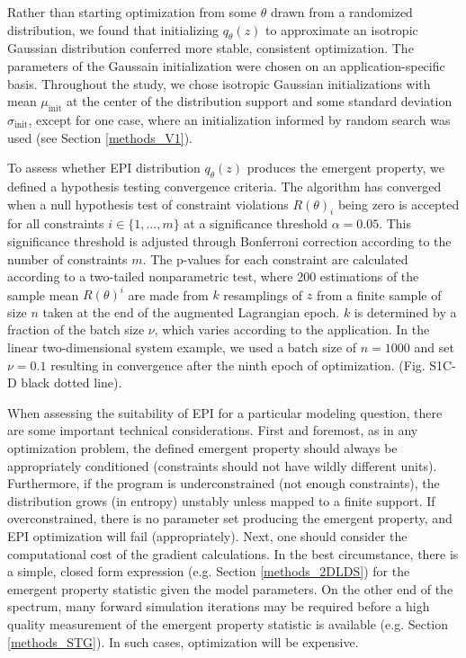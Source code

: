 \documentclass[11pt]{article}
\begin{document}
Rather than starting optimization from some $\theta$ drawn from a randomized distribution, we found that initializing $q_\theta(z)$ to approximate an isotropic Gaussian distribution conferred more stable, consistent optimization.  The parameters of the Gaussain initialization were chosen on an application-specific basis.  
Throughout the study, we chose isotropic Gaussian initializations with mean $\mu_{\text{init}}$ at the center of the distribution support and some standard deviation $\sigma_{\text{init}}$, except for one case, where an initialization informed by random search was used (see Section \ref{methods_V1}).

To assess whether EPI distribution $q_\theta(z)$ produces the emergent property, we defined a hypothesis testing convergence criteria.  
The algorithm has converged when a null hypothesis test of constraint violations $R(\theta)_i$ being zero is accepted for all constraints $i \in \{1, ..., m\}$ at a significance threshold $\alpha=0.05$.  
This significance threshold is adjusted through Bonferroni correction according to the number of constraints $m$.  
The p-values for each constraint are calculated according to a two-tailed nonparametric test, where 200 estimations of the sample mean $R(\theta)^i$ are made from $k$ resamplings of $z$ from a finite sample of size $n$ taken at the end of the augmented Lagrangian epoch.
$k$ is determined by a fraction of the batch size $\nu$, which varies according to the application.
In the linear two-dimensional system example, we used a batch size of $n = 1000$ and set $\nu = 0.1$ resulting in convergence after the ninth epoch of optimization. (Fig. S1C-D black dotted line).

When assessing the suitability of EPI for a particular modeling question, there are some important technical considerations. 
First and foremost, as in any optimization problem, the defined emergent property should always be appropriately conditioned (constraints should not have wildly different units).  
Furthermore, if the program is underconstrained (not enough constraints), the distribution grows (in entropy) unstably unless mapped to a finite support.  
If overconstrained, there is no parameter set producing the emergent property, and EPI optimization will fail (appropriately).
Next, one should consider the computational cost of the gradient calculations. 
In the best circumstance, there is a simple, closed form expression (e.g. Section \ref{methods_2DLDS}) for the emergent property statistic given the model parameters.  
On the other end of the spectrum, many forward simulation iterations may be required before a high quality measurement of the emergent property statistic is available  (e.g. Section \ref{methods_STG}).  In such cases, optimization will be expensive.
\end{document}
